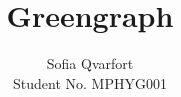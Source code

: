 
\usepackage{courier}

\usepackage{multicol}
 
\title{Greengraph}
\author{Sofia Qvarfort \\Student No. 
MPHYG001}

\maketitle


\begin{abstract}
\end{abstract}
\begin{multicols}{2}

\small


\end{multicols}
